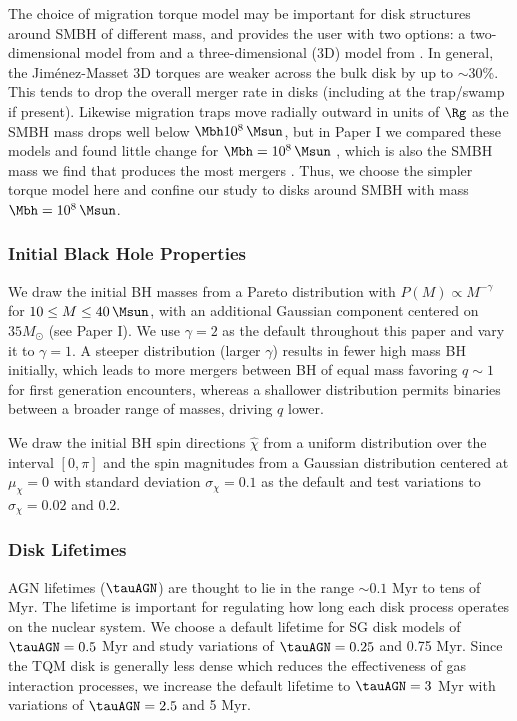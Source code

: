 The choice of migration torque model may be important for disk structures around SMBH of different mass, and  provides the user with two options: a two-dimensional model from \citet{Paardekooper+10} and a three-dimensional (3D) model from \citet{JimenezMassset17}.
In general, the Jim\'enez-Masset 3D torques are weaker across the bulk disk by up to $\sim$30\%.
This tends to drop the overall merger rate in disks (including at the trap/swamp if present).
Likewise migration traps move radially outward in units of $\Rg$ as the SMBH mass drops well below $\Mbh 10^8\,\Msun$, but in Paper I we compared these models and found little change for $\Mbh = 10^8\,\Msun$ \citep[see Fig. 6 \& 7 of][]{McKernan+25-mcfactsI}, which is also the SMBH mass we find that produces the most mergers \citep{Delfavero+25}.
Thus, we choose the simpler \citet{Paardekooper+10} torque model here and confine our study to disks around SMBH with mass $\Mbh = 10^8\,\Msun$.

\subsubsection{Initial Black Hole Properties}
We draw the initial BH masses from a Pareto distribution with $P(M) \propto M^{-\gamma}$ for $10\leq M \leq40\,\Msun$, with an additional Gaussian component centered on $35M_{\odot}$ (see Paper I).
We use $\gamma=2$ as the default throughout this paper and vary it to $\gamma=1$.
A steeper distribution (larger $\gamma$) results in fewer high mass BH initially, which leads to more mergers between BH of equal mass favoring $q\sim1$ for first generation encounters, whereas a shallower distribution permits binaries between a broader range of masses, driving $q$ lower.

We draw the initial BH spin directions $\hat{\chi}$ from a uniform distribution over the interval $[0,\pi]$ and the spin magnitudes from a Gaussian distribution centered at $\mu_\chi=0$ with standard deviation $\sigma_{\chi} = 0.1$ as the default and test variations to $\sigma_{\chi}=0.02$ and $0.2$.

\subsubsection{Disk Lifetimes}
AGN lifetimes ($\tauAGN$) are thought to lie in the range $\sim 0.1$ Myr to tens of Myr.
The lifetime is important for regulating how long each disk process operates on the nuclear system.
We choose a default lifetime for SG disk models of $\tauAGN=0.5$ Myr and study variations of $\tauAGN = 0.25$ and 0.75 Myr.
Since the TQM disk is generally less dense which reduces the effectiveness of gas interaction processes, we increase the default lifetime to $\tauAGN = 3$ Myr with variations of $\tauAGN = 2.5$ and 5 Myr.

